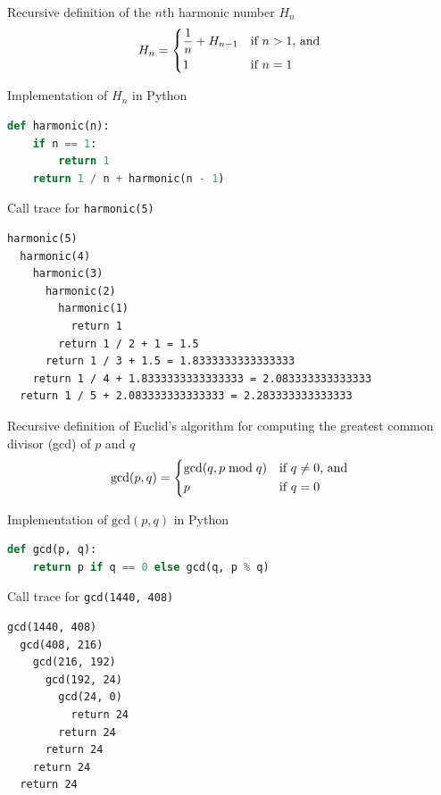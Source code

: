 \documentclass[8pt,a4paper,compress]{beamer}
\begin{document}
\begin{frame}[fragile]
\pause

Recursive definition of the $n$th harmonic number $H_n$
\[
H_n = \begin{dcases*}
\frac{1}{n} + H_{n-1} & if $n > 1$, and \\
1       & if $n=1$
\end{dcases*}
\]

\pause
\bigskip

Implementation of $H_n$ in Python
 
\begin{lstlisting}[language=Python]
def harmonic(n):
    if n == 1:
        return 1
    return 1 / n + harmonic(n - 1)
\end{lstlisting}

\pause
\bigskip

Call trace for \lstinline{harmonic(5)}
\begin{lstlisting}[language={}]
harmonic(5)
  harmonic(4)
    harmonic(3)
      harmonic(2)
        harmonic(1)
          return 1
        return 1 / 2 + 1 = 1.5
      return 1 / 3 + 1.5 = 1.8333333333333333
    return 1 / 4 + 1.8333333333333333 = 2.083333333333333
  return 1 / 5 + 2.083333333333333 = 2.283333333333333
\end{lstlisting}
\end{frame}

\begin{frame}[fragile]
\pause

Recursive definition of Euclid's algorithm for computing the greatest common divisor (gcd) of $p$ and $q$
\[
\text{gcd}(p, q) = \begin{dcases*}
\text{gcd}(q, p \bmod q) & if $q \neq 0$, and \\
p       & if $q = 0$
\end{dcases*}
\]

\pause
\bigskip

Implementation of $\text{gcd}(p, q)$ in Python

\begin{lstlisting}[language=Python]
def gcd(p, q):
    return p if q == 0 else gcd(q, p % q) 
\end{lstlisting}

\pause
\bigskip

Call trace for \lstinline{gcd(1440, 408)}

\begin{lstlisting}[language={}]
gcd(1440, 408)
  gcd(408, 216)
    gcd(216, 192)
      gcd(192, 24)
        gcd(24, 0)
          return 24
        return 24
      return 24
    return 24
  return 24
\end{lstlisting}
\end{frame}
\end{document}

